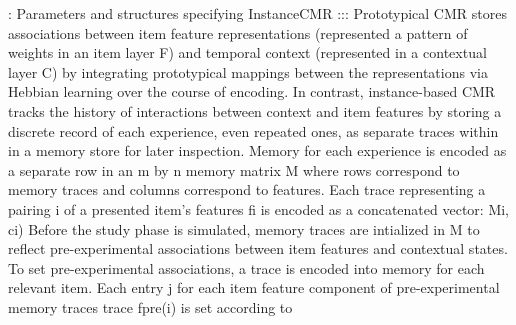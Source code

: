 {}: Parameters and structures specifying InstanceCMR :::\markdownRendererInterblockSeparator
{}\markdownRendererInterblockSeparator
{}Prototypical CMR stores associations between item feature representations (represented a pattern of weights in an item layer \markdownRendererDollarSign{}F\markdownRendererDollarSign{}) and temporal context (represented in a contextual layer \markdownRendererDollarSign{}C\markdownRendererDollarSign{}) by integrating prototypical mappings between the representations via Hebbian learning over the course of encoding. In contrast, instance-based CMR tracks the history of interactions between context and item features by storing a discrete record of each experience, even repeated ones, as separate traces within in a memory store for later inspection. Memory for each experience is encoded as a separate row in an \markdownRendererDollarSign{}m\markdownRendererDollarSign{} by \markdownRendererDollarSign{}n\markdownRendererDollarSign{} memory matrix \markdownRendererDollarSign{}M\markdownRendererDollarSign{} where rows correspond to memory traces and columns correspond to features. Each trace representing a pairing \markdownRendererDollarSign{}i\markdownRendererDollarSign{} of a presented item's features \markdownRendererDollarSign{}fi\markdownRendererDollarSign{} is encoded as a concatenated vector:\markdownRendererInterblockSeparator
{}\markdownRendererDollarSign{}\markdownRendererDollarSign{}Mi, c\markdownRendererUnderscore{}i)\markdownRendererDollarSign{}\markdownRendererDollarSign{}\markdownRendererInterblockSeparator
{}\markdownRendererInterblockSeparator
{}Before the study phase is simulated, memory traces are intialized in \markdownRendererDollarSign{}M\markdownRendererDollarSign{} to reflect pre-experimental associations between item features and contextual states. To set pre-experimental associations, a trace is encoded into memory for each relevant item. Each entry \markdownRendererDollarSign{}j\markdownRendererDollarSign{} for each item feature component of pre-experimental memory traces trace \markdownRendererDollarSign{}f\markdownRendererUnderscore{}pre(i)\markdownRendererDollarSign{} is set according to\markdownRendererInterblockSeparator
